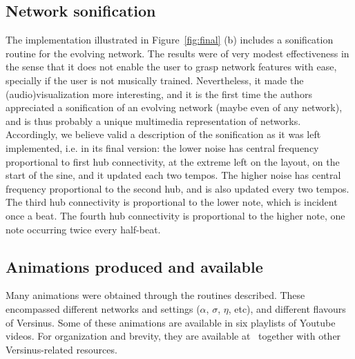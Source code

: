 \documentclass[runningheads]{llncs}
\begin{document}
\subsection{Network sonification}
The implementation illustrated in Figure~\ref{fig:final} (b) includes a sonification routine for the evolving network.
The results were of very modest effectiveness in the sense that it does not enable the user to grasp network features with ease, specially if the user is not musically trained.
Nevertheless, it made the (audio)visualization more interesting, and it is the first time the authors appreciated a sonification of an evolving network (maybe even of any network), and is thus probably a unique multimedia representation of networks.
Accordingly, we believe valid a description of the sonification as it was left implemented, i.e. in its final version: the lower noise has central frequency proportional to first hub connectivity, at the extreme left on the layout, on the start of the sine, and it updated each two tempos. The higher noise has central frequency proportional to the second hub, and is also updated every two tempos. The third hub connectivity is proportional to the lower note, which is incident once a beat. The fourth hub connectivity is proportional to the higher note, one note occurring twice every half-beat.

\subsection{Animations produced and available}\label{sec:vid}
Many animations were obtained through the routines described.
These encompassed different networks and settings ($\alpha$, $\sigma$, $\eta$,
etc), and different flavours of Versinus.
Some of these animations are available in six playlists of Youtube videos.
For organization and brevity, they are available at~\cite{verRepo} together with other Versinus-related resources.
\end{document}
